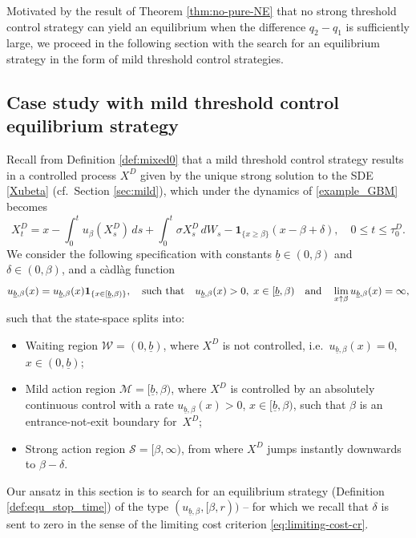 \documentclass[11pt]{article} %
\def\ub{\underline{b}}
\numberwithin{komcounter}{section}
\begin{document}
Motivated by the result of Theorem \ref{thm:no-pure-NE}  that no strong threshold control strategy can yield an equilibrium when the difference $q_2-q_1$ is sufficiently large, we proceed in the following section with the search for an equilibrium strategy in the form of mild threshold control strategies.



\subsection{Case study with mild threshold control equilibrium strategy} 
\label{sec:mixed-case}
Recall from Definition \ref{def:mixed0} that a mild threshold control strategy results in a controlled process $X^D$ given by the unique strong solution to the SDE \eqref{Xubeta} (cf.~Section \ref{sec:mild}), which under the dynamics of \eqref{example_GBM} becomes
$$
X_t^{D} = 
x - \int_0^t u_\beta(X_s^{D}) \, ds + \int_0^t \sigma X_s^{D} \, dW_s - \mathbf{1}_{\{x \geq \beta\}}(x-\beta + \delta), 
\quad  0 \leq t \leq \tau^D_0.
$$
We consider the following specification with constants $\ub \in (0,\beta)$ and $\delta \in (0,\beta)$, and a c\`adl\`ag function 
$$
u_{\ub,\beta}(x) = u_{\ub,\beta}(x) {\bf 1}_{\{x \in [\ub,\beta)\}}, 
\quad \text{such that} \quad 
u_{\ub,\beta}(x) > 0, \; x \in [\ub,\beta)
\quad \text{and} \quad 
\lim_{x \uparrow \beta} u_{\ub,\beta}(x) = \infty,
$$
such that the state-space splits into:
\begin{itemize}
\vspace{-1mm}
\item Waiting region $\mathcal{W}=(0,\ub)$, where $X^D$ is not controlled, i.e.~$u_{\ub,\beta}(x)=0$, $x\in(0,\ub)$; 

\vspace{-1mm}
\item Mild action region $\mathcal{M}=[\ub,\beta)$, where $X^D$ is controlled by an absolutely continuous control with a rate $u_{\ub,\beta}(x)>0$, $x\in [\ub, \beta)$, such that $\beta$ is an entrance-not-exit boundary for~$X^D$; 

\vspace{-1mm}
\item Strong action region $\mathcal{S}=[\beta,\infty)$, from where $X^D$ jumps instantly downwards to $\beta - \delta$. 
\end{itemize}
\vspace{-1mm}
Our ansatz in this section is to search for an equilibrium strategy (Definition \ref{def:equ_stop_time}) of the type $(u_{\ub,\beta}, [\beta,r))$ -- for which we recall that $\delta$ is sent to zero in the sense of the limiting cost criterion \eqref{eq:limiting-cost-cr}.
\end{document}
